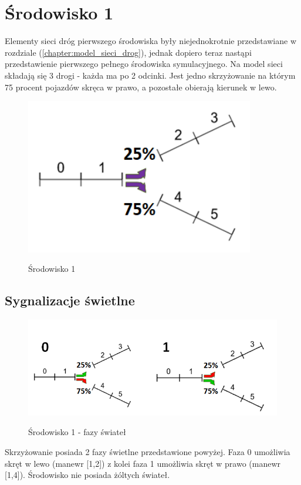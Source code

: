 \documentclass[12pt]{book}
\theoremstyle{plain}
\newcommand{\myref}[1]{(\ref{#1})}
\begin{document}
\section{Środowisko 1}
Elementy sieci dróg pierwszego środowiska były niejednokrotnie przedstawiane w rozdziale \myref{chapter:model_sieci_drog}, jednak dopiero teraz nastąpi przedstawienie pierwszego pełnego środowiska symulacyjnego. Na model sieci składają się 3 drogi - każda ma po 2 odcinki. Jest jedno skrzyżowanie na którym 75 procent pojazdów skręca w prawo, a pozostałe obierają kierunek w lewo.
\begin{figure}[H]
	\centering
	\includegraphics[width=10cm]{images/env_11_procenty}
	\label{fig:env_11}
	\caption{Środowisko 1}
\end{figure}

\subsection{Sygnalizacje świetlne}	
\begin{figure}[H]
	\centering
	\includegraphics[width=17cm]{images/env_11_fazy_procenty_no_yellow}
	\label{fig:env_11_fazy}
	\caption{Środowisko 1 - fazy świateł}
\end{figure}\noindent
Skrzyżowanie posiada 2 fazy świetlne przedstawione powyżej. Faza 0 umożliwia skręt w lewo (manewr [1,2]) z kolei faza 1 umożliwia skręt w prawo (manewr [1,4]). Środowisko nie posiada żóltych świateł.
\end{document}
